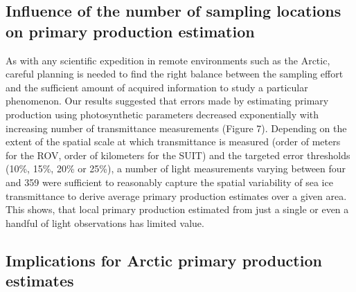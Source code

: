 \documentclass[draft]{agujournal2018}
\begin{document}
\subsection{Influence of the number of sampling locations on primary production estimation}

As with any scientific expedition in remote environments such as the Arctic, careful planning is needed to find the right balance between the sampling effort and the sufficient  amount of acquired information to study a particular phenomenon. Our results suggested that errors made by estimating primary production using photosynthetic parameters decreased exponentially with increasing number of transmittance measurements (Figure 7). Depending on the extent of the spatial scale at which transmittance is measured (order of meters for the ROV, order of kilometers for the SUIT) and the targeted error thresholds (10\%, 15\%, 20\% or 25\%), a number of light measurements varying between four and 359 were sufficient to reasonably capture the spatial variability of sea ice transmittance to derive average primary production estimates over a given area. This shows, that local primary production estimated from just a single or even a handful of light observations has limited value.

\subsection{Implications for Arctic primary production estimates}
\end{document}
